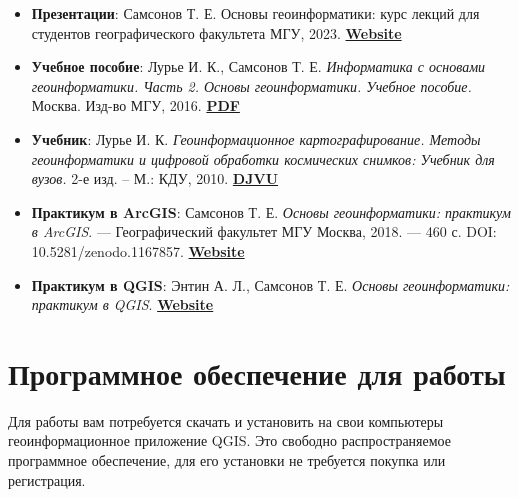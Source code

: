 \documentclass[
  12pt,
]{book}
\begin{document}
\begin{itemize}
\item
  \textbf{Презентации}: Самсонов Т. Е. Основы геоинформатики: курс лекций для студентов географического факультета МГУ, 2023. \href{https://tsamsonov.github.io/gis-course/}{\textbf{Website}}
\item
  \textbf{Учебное пособие}: Лурье И. К., Самсонов Т. Е. \emph{Информатика с основами геоинформатики. Часть 2. Основы геоинформатики. Учебное пособие.} Москва. Изд-во МГУ, 2016. \href{https://github.com/aentin/qgis-course/raw/master/files/\%D0\%9F\%D0\%BE\%D1\%81\%D0\%BE\%D0\%B1\%D0\%B8\%D0\%B5.pdf}{\textbf{PDF}}
\item
  \textbf{Учебник}: Лурье И. К. \emph{Геоинформационное картографирование. Методы геоинформатики и цифровой обработки космических снимков: Учебник для вузов.} 2-е изд. -- М.: КДУ, 2010. \href{https://github.com/aentin/qgis-course/raw/master/files/\%D0\%9B\%D1\%83\%D1\%80\%D1\%8C\%D0\%B5_\%D0\%93\%D0\%B5\%D0\%BE\%D0\%B8\%D0\%BD\%D1\%84\%D0\%BE\%D1\%80\%D0\%BC\%D0\%B0\%D1\%86\%D0\%B8\%D0\%BE\%D0\%BD\%D0\%BD\%D0\%BE\%D0\%B5\%D0\%9A\%D0\%B0\%D1\%80\%D1\%82\%D0\%BE\%D0\%B3\%D1\%80\%D0\%B0\%D1\%84\%D0\%B8\%D1\%80\%D0\%BE\%D0\%B2\%D0\%B0\%D0\%BD\%D0\%B8\%D0\%B5.djvu}{\textbf{DJVU}}
\item
  \textbf{Практикум в ArcGIS}: Самсонов Т. Е. \emph{Основы геоинформатики: практикум в ArcGIS}. --- Географический факультет МГУ Москва, 2018. --- 460 с. DOI: 10.5281/zenodo.1167857. \href{https://tsamsonov.github.io/arcgis-course/}{\textbf{Website}}
\item
  \textbf{Практикум в QGIS}: Энтин А. Л., Самсонов Т. Е. \emph{Основы геоинформатики: практикум в QGIS}. \href{https://aentin.github.io/qgis-course/}{\textbf{Website}}
\end{itemize}

\hypertarget{ux43fux440ux43eux433ux440ux430ux43cux43cux43dux43eux435-ux43eux431ux435ux441ux43fux435ux447ux435ux43dux438ux435-ux434ux43bux44f-ux440ux430ux431ux43eux442ux44b}{%
\section*{Программное обеспечение для работы}\label{ux43fux440ux43eux433ux440ux430ux43cux43cux43dux43eux435-ux43eux431ux435ux441ux43fux435ux447ux435ux43dux438ux435-ux434ux43bux44f-ux440ux430ux431ux43eux442ux44b}}

Для работы вам потребуется скачать и установить на свои компьютеры геоинформационное приложение QGIS. Это свободно распространяемое программное обеспечение, для его установки не требуется покупка или регистрация.
\end{document}
